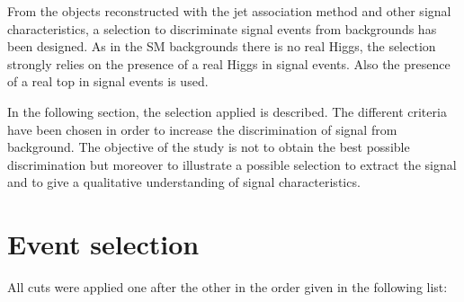 From the objects reconstructed with the jet association method and other signal characteristics, a selection to discriminate signal events from backgrounds has been designed. As in the SM backgrounds there is no real Higgs, the selection strongly relies on the presence of a real Higgs in signal events. Also the presence of a real top in signal events is used. 

In the following section, the selection applied is described. The different criteria have been chosen in order to increase the discrimination of signal from background. The objective of the study is not to obtain the best possible discrimination but moreover to illustrate a possible selection to extract the signal and to give a qualitative understanding of signal characteristics.

\section{Event selection}
\label{sec:Psel}

All cuts were applied one after the other in the order given in the following list:

